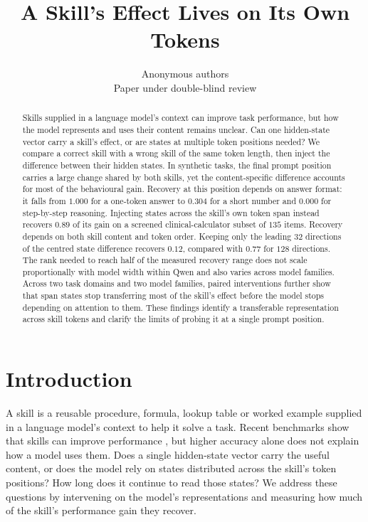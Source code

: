 \documentclass{article}
\title{A Skill's Effect Lives on Its Own Tokens}
\author{Anonymous authors \\
Paper under double-blind review}
\begin{document}
\maketitle

\begin{abstract}
Skills supplied in a language model's context can improve task performance,
but how the model represents and uses their content remains unclear. Can one
hidden-state vector carry a skill's effect, or are states at multiple token
positions needed? We compare a correct skill with a wrong skill of the same
token length, then inject the difference between their hidden states. In
synthetic tasks, the final prompt position carries a large change shared by
both skills, yet the content-specific difference accounts for most of the
behavioural gain. Recovery at this position depends on answer format: it falls
from $1.000$ for a one-token answer to $0.304$ for a short number and $0.000$
for step-by-step reasoning. Injecting states across the skill's own token span
instead recovers $0.89$ of its gain on a screened clinical-calculator subset
of $135$ items. Recovery depends on both skill content and token order.
Keeping only the leading $32$ directions of the centred state difference
recovers $0.12$, compared with $0.77$ for $128$ directions. The rank needed to
reach half of the measured recovery range does not scale proportionally with
model width within Qwen and also varies across model families. Across two task
domains and two model families, paired interventions further show that span
states stop transferring most of the skill's effect before the model stops
depending on attention to them. These findings identify a transferable
representation across skill tokens and clarify the limits of probing it at a
single prompt position.
\end{abstract}

\section{Introduction}
\label{sec:intro}

A skill is a reusable procedure, formula, lookup table or worked example supplied
in a language model's context to help it solve a task. Recent benchmarks show
that skills can improve performance \citep{su2026srabench, skillsbench2026},
but higher accuracy alone does not explain how a model uses them. Does a single
hidden-state vector carry the useful content, or does the model rely on states
distributed across the skill's token positions? How long does it continue to
read those states? We address these questions by intervening on the model's
representations and measuring how much of the skill's performance gain they
recover.
\end{document}
